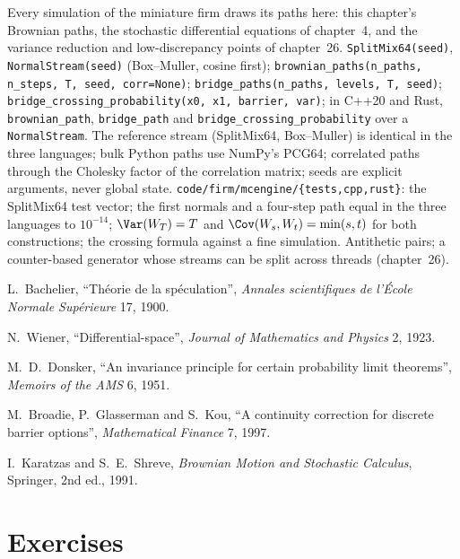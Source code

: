 \begin{build}
 Every simulation of the miniature firm draws its paths here: this chapter's
Brownian paths, the stochastic differential equations of chapter~4, and the variance reduction
and low-discrepancy points of chapter~26.
 \texttt{SplitMix64(seed)}, \texttt{NormalStream(seed)} (Box--Muller, cosine
first); \texttt{brownian\_paths(n\_paths, n\_steps, T, seed, corr=None)};
\texttt{bridge\_paths(n\_paths, levels, T, seed)};
\texttt{bridge\_crossing\_probability(x0, x1, barrier, var)}; in C++20 and Rust,
\texttt{brownian\_path}, \texttt{bridge\_path} and \texttt{bridge\_crossing\_probability} over a
\texttt{NormalStream}.
 The reference stream (SplitMix64, Box--Muller) is identical in the three
languages; bulk Python paths use NumPy's PCG64; correlated paths through the Cholesky factor
of the correlation matrix; seeds are explicit arguments, never global state.
 \texttt{code/firm/mcengine/\{tests,cpp,rust\}}: the SplitMix64 test
vector; the first normals and a four-step path equal in the three languages to $10^{-14}$;
$\Var(W_T) = T$ and $\Cov(W_s, W_t) = \min(s,t)$ for both constructions; the crossing formula
against a fine simulation.
 Antithetic pairs; a counter-based generator whose streams can be split across
threads (chapter~26).
\end{build}

\begin{omsources}
\item L.~Bachelier, ``Théorie de la spéculation'', \emph{Annales scientifiques de l'École
Normale Supérieure} 17, 1900.
\item N.~Wiener, ``Differential-space'', \emph{Journal of Mathematics and Physics} 2, 1923.
\item M.~D.~Donsker, ``An invariance principle for certain probability limit theorems'',
\emph{Memoirs of the AMS} 6, 1951.
\item M.~Broadie, P.~Glasserman and S.~Kou, ``A continuity correction for discrete barrier
options'', \emph{Mathematical Finance} 7, 1997.
\item I.~Karatzas and S.~E.~Shreve, \emph{Brownian Motion and Stochastic Calculus},
Springer, 2nd ed., 1991.
\end{omsources}

\section{Exercises}

